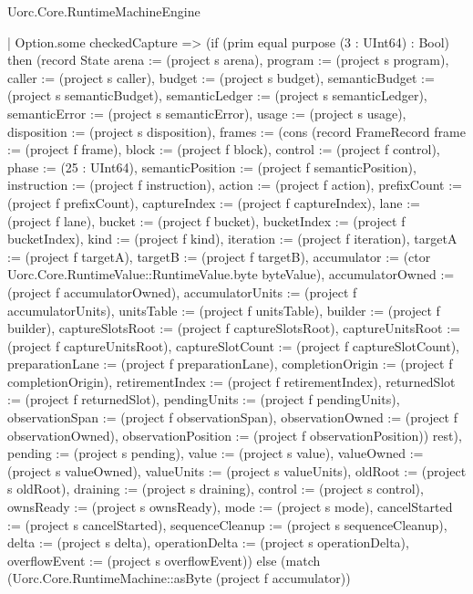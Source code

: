 \begin{lexlean}{Uorc.Core.RuntimeMachineEngine}
\begin{semanticmodule}
{      | Option.some checkedCapture => (if (prim equal purpose (3 : UInt64) : Bool) then (record State {arena := (project s arena), program := (project s program), caller := (project s caller), budget := (project s budget), semanticBudget := (project s semanticBudget), semanticLedger := (project s semanticLedger), semanticError := (project s semanticError), usage := (project s usage), disposition := (project s disposition), frames := (cons (record FrameRecord {frame := (project f frame), block := (project f block), control := (project f control), phase := (25 : UInt64), semanticPosition := (project f semanticPosition), instruction := (project f instruction), action := (project f action), prefixCount := (project f prefixCount), captureIndex := (project f captureIndex), lane := (project f lane), bucket := (project f bucket), bucketIndex := (project f bucketIndex), kind := (project f kind), iteration := (project f iteration), targetA := (project f targetA), targetB := (project f targetB), accumulator := (ctor Uorc.Core.RuntimeValue::RuntimeValue.byte byteValue), accumulatorOwned := (project f accumulatorOwned), accumulatorUnits := (project f accumulatorUnits), unitsTable := (project f unitsTable), builder := (project f builder), captureSlotsRoot := (project f captureSlotsRoot), captureUnitsRoot := (project f captureUnitsRoot), captureSlotCount := (project f captureSlotCount), preparationLane := (project f preparationLane), completionOrigin := (project f completionOrigin), retirementIndex := (project f retirementIndex), returnedSlot := (project f returnedSlot), pendingUnits := (project f pendingUnits), observationSpan := (project f observationSpan), observationOwned := (project f observationOwned), observationPosition := (project f observationPosition)}) rest), pending := (project s pending), value := (project s value), valueOwned := (project s valueOwned), valueUnits := (project s valueUnits), oldRoot := (project s oldRoot), draining := (project s draining), control := (project s control), ownsReady := (project s ownsReady), mode := (project s mode), cancelStarted := (project s cancelStarted), sequenceCleanup := (project s sequenceCleanup), delta := (project s delta), operationDelta := (project s operationDelta), overflowEvent := (project s overflowEvent)}) else (match (Uorc.Core.RuntimeMachine::asByte (project f accumulator))
}
\end{semanticmodule}
\end{lexlean}
